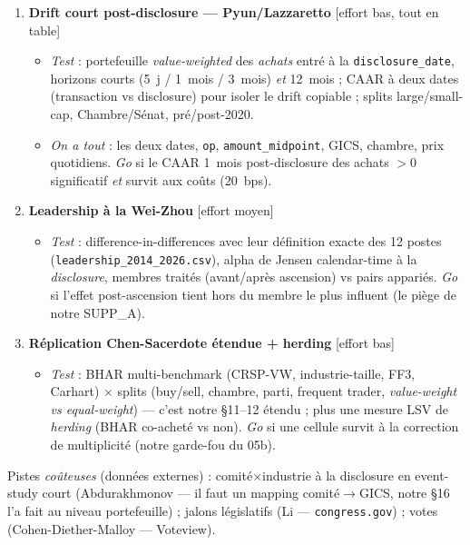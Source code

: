\documentclass[11pt,a4paper]{article}
\newcommand{\code}[1]{\texttt{\small #1}}
\begin{document}
\begin{enumerate}[leftmargin=1.6em]
  \item \textbf{Drift court post-disclosure --- Pyun/Lazzaretto} \hfill \textcolor{vert}{[effort bas, tout en table]}
  \begin{itemize}
    \item \emph{Test} : portefeuille \emph{value-weighted} des \emph{achats} entré à la \code{disclosure\_date},
    horizons courts (5~j / 1~mois / 3~mois) \emph{et} 12~mois ; CAAR à deux dates (transaction vs disclosure)
    pour isoler le drift copiable ; splits large/small-cap, Chambre/Sénat, pré/post-2020.
    \item \emph{On a tout} : les deux dates, \code{op}, \code{amount\_midpoint}, GICS, chambre, prix quotidiens.
    \emph{Go} si le CAAR 1~mois post-disclosure des achats $> 0$ significatif \emph{et} survit aux coûts (20~bps).
  \end{itemize}
  \item \textbf{Leadership à la Wei-Zhou} \hfill \textcolor{vert}{[effort moyen]}
  \begin{itemize}
    \item \emph{Test} : difference-in-differences avec leur définition exacte des 12 postes
    (\code{leadership\_2014\_2026.csv}), alpha de Jensen calendar-time à la \emph{disclosure}, membres traités
    (avant/après ascension) vs pairs appariés. \emph{Go} si l'effet post-ascension tient hors du membre le plus
    influent (le piège de notre SUPP\_A).
  \end{itemize}
  \item \textbf{Réplication Chen-Sacerdote \'etendue + herding} \hfill \textcolor{vert}{[effort bas]}
  \begin{itemize}
    \item \emph{Test} : BHAR multi-benchmark (CRSP-VW, industrie-taille, FF3, Carhart) $\times$ splits
    (buy/sell, chambre, parti, frequent trader, \emph{value-weight vs equal-weight}) --- c'est notre §11--12
    étendu ; plus une mesure LSV de \emph{herding} (BHAR co-acheté vs non). \emph{Go} si une cellule survit à
    la correction de multiplicité (notre garde-fou du 05b).
  \end{itemize}
\end{enumerate}
Pistes \emph{coûteuses} (données externes) : comité$\times$industrie à la disclosure en event-study court
(Abdurakhmonov --- il faut un mapping comité$\to$GICS, notre §16 l'a fait au niveau portefeuille) ; jalons
législatifs (Li --- \code{congress.gov}) ; votes (Cohen-Diether-Malloy --- Voteview).
\end{document}
